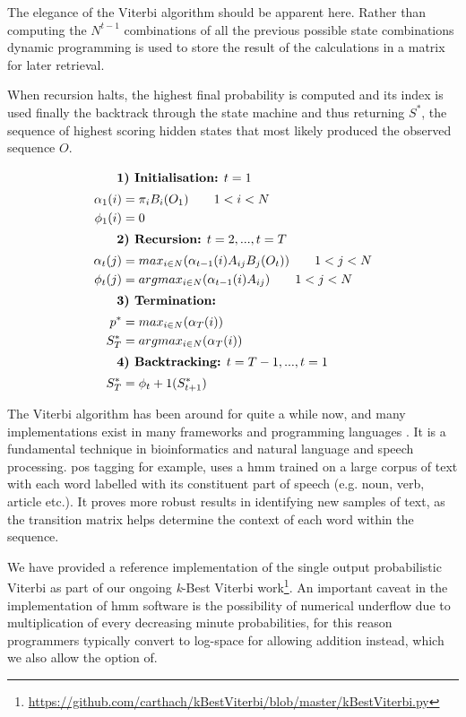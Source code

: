 {{{{{{{The elegance of the Viterbi algorithm should be apparent here. Rather than computing the $N^{t-1}$ combinations of all the previous possible state combinations dynamic programming is used to store the result of the calculations in a matrix for later retrieval. 

When recursion halts, the highest final probability is computed and its index is used finally the backtrack through the state machine and thus returning $S^*$, the sequence of highest scoring hidden states that most likely produced the observed sequence $O$.


\setlength{\parindent}{1cm}

\indent
{
\begin{align}
\intertext{ \indent \textbf{1) Initialisation:} $t=1$}
			\alpha_1(i) &= \pi_{i}B_{i}(O_1)\qquad1<i<N \nonumber \\
			\phi_1(i) &= 0 \label{eq:markovstart} \\
\intertext{ \indent \textbf{2) Recursion:} $t=2,...,t=T$}
			\alpha_t(j) &= max_{i\in N}(\alpha_{t-1}(i)A_{ij}B_{j}(O_{t}))\qquad1<j<N \nonumber \\
			\phi_t(j) &= argmax_{i\in N}(\alpha_{t-1}(i)A_{ij})\qquad1<j<N\\
\intertext{ \indent \textbf{3) Termination:}}
			p^* &= max_{i \in N}(\alpha_T(i)) \nonumber \\
			S^*_{T} &= argmax_{i \in N}(\alpha_T(i))\\
\intertext{ \indent \textbf{4) Backtracking:} $t=T-1,...,t=1$}
			S^*_{T} &= \phi_t+1(S^*_{t+1}) \label{eq:markovend}
\end{align}
}

\normalsize

The Viterbi algorithm has been around for quite a while now, and many  implementations exist in many frameworks and programming languages \citep{Bird2016, Gueguen2005}. It is a fundamental technique in bioinformatics and natural language and speech processing. \acrshort{pos} tagging for example, uses a \acrshort{hmm} trained on a large corpus of text with each word labelled with its constituent part of speech (e.g. noun, verb, article etc.). It proves more robust results in identifying new samples of text, as the transition matrix helps determine the context of each word within the sequence. 

We have provided a reference implementation of the single output probabilistic Viterbi as part of our ongoing \textit{k}-Best Viterbi work\footnote{\url{https://github.com/carthach/kBestViterbi/blob/master/kBestViterbi.py}}. An important caveat in the implementation of \acrshort{hmm} software is the possibility of numerical underflow due to multiplication of every decreasing minute probabilities, for this reason programmers typically convert to log-space for allowing addition instead, which we also allow the option of.

}}}}}}}
